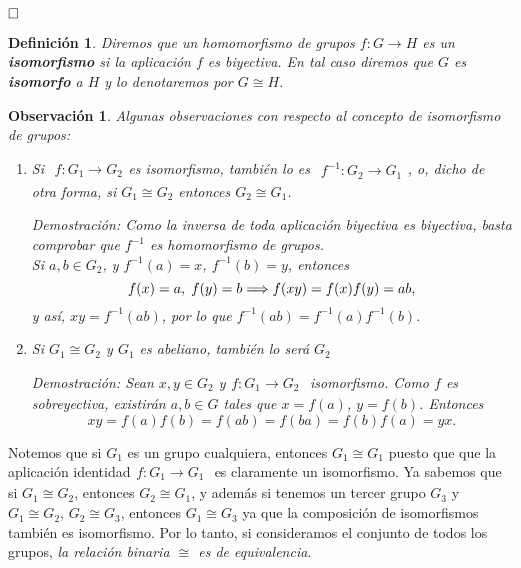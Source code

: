 \documentclass[12pt]{article}
\newtheorem{definition}[theorem]{Definición}
\newtheorem{observation}{Observación}[theorem]
\begin{document}
$\hfill \square$

\begin{definition}Diremos que un homomorfismo de grupos $f \colon G \longrightarrow H$ es un \textbf{isomorfismo} si la aplicación $f$ es biyectiva. En tal caso diremos que $G$ es \textbf{isomorfo} a $H$ y lo denotaremos por $G \cong H$.
\end{definition}

\begin{observation} Algunas observaciones con respecto al concepto de isomorfismo de grupos:
\begin{enumerate}
\item Si $
\begin{array}{rccl}
f\colon G_{1} \longrightarrow  G_{2}
\end{array}
$es isomorfismo, también lo es $
\begin{array}{rccl}
f^{-1}\colon G_{2} \longrightarrow  G_{1}
\end{array}
$, o, dicho de otra forma, si $G_{1}\cong G_{2}$ entonces $G_{2}\cong G_{1}$.

\emph{Demostración: }Como la inversa de toda aplicación biyectiva es biyectiva, basta comprobar que $f^{-1}$ es homomorfismo de grupos.\vspace{0.2cm}\\
Si $a,b \in G_{2}$, y $f^{-1}(a)= x$, $f^{-1}(b) = y$, entonces $$f(x) = a, \hspace{0.1cm} f(y) = b\Longrightarrow f(xy) = f(x)f(y) = ab,$$ y así, $xy = f^{-1}(ab)$, por lo que $f^{-1}(ab) = f^{-1}(a)f^{-1}(b).$
\item Si $G_{1}\cong G_{2}$ y $G_{1}$ es abeliano, también lo será $G_{2}$

\emph{Demostración: }Sean $x,y \in G_{2}$ y$
\begin{array}{rccl}
f\colon G_{1} \longrightarrow  G_{2}
\end{array}
$ isomorfismo. Como $f$ es sobreyectiva, existirán $a,b \in G$ tales que $x = f(a)$, $y = f(b)$. Entonces $$xy = f(a)f(b) = f(ab) = f(ba) = f(b)f(a) = yx.$$
\end{enumerate}
\end{observation}

Notemos que si $G_{1}$ es un grupo cualquiera, entonces $G_{1} \cong G_{1}$ puesto que que la aplicación identidad$
\begin{array}{rccl}
f\colon G_{1} \longrightarrow  G_{1}
\end{array}
$ es claramente un isomorfismo. Ya sabemos que si $G_{1}\cong G_{2}$, entonces $G_{2} \cong G_{1}$, y además si tenemos un tercer grupo $G_{3}$ y $G_{1} \cong G_{2}$, $G_{2} \cong G_{3}$, entonces $G_{1} \cong G_{3}$ ya que la composición de isomorfismos también es isomorfismo. Por lo tanto, si consideramos el conjunto de todos los grupos, \textit{la relación binaria $\cong$ es de equivalencia}.
\end{document}
